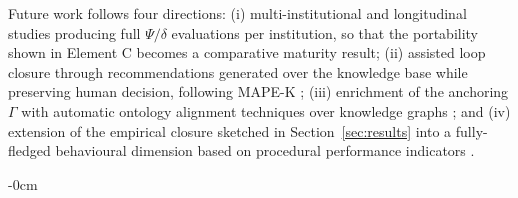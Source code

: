 \documentclass[engproc,article,submit,moreauthors]{Definitions/mdpi}
\begin{document}
Future work follows four directions: (i) multi-institutional and longitudinal studies producing full $\Psi/\delta$ evaluations per institution, so that the portability shown in Element C becomes a comparative maturity result; (ii) assisted loop closure through recommendations generated over the knowledge base while preserving human decision, following MAPE-K \cite{Kephart2003}; (iii) enrichment of the anchoring $\Gamma$ with automatic ontology alignment techniques over knowledge graphs \cite{Hogan2021}; and (iv) extension of the empirical closure sketched in Section~\ref{sec:results} into a fully-fledged behavioural dimension based on procedural performance indicators \cite{Medvedeva2020}.

\vspace{6pt}







\begin{adjustwidth}{-\extralength}{0cm}

\end{adjustwidth}
\end{document}
